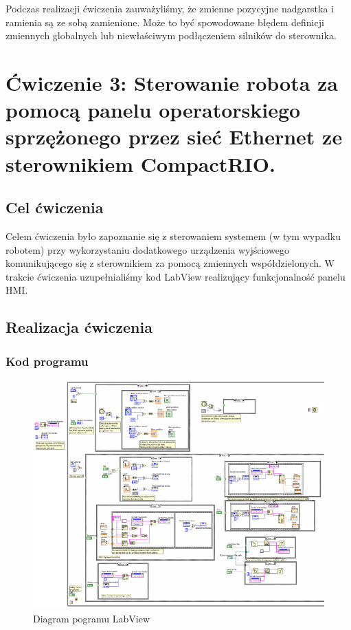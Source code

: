 \documentclass[margin = 2cm]{article}
\begin{document}
Podczas realizacji ćwiczenia zauważyliśmy, że zmienne pozycyjne nadgarstka i ramienia są ze sobą zamienione. Może to być spowodowane błędem definicji zmiennych globalnych lub niewłaściwym podłączeniem silników do sterownika.


\section{Ćwiczenie 3: Sterowanie robota za pomocą panelu operatorskiego sprzężonego przez sieć
Ethernet ze sterownikiem CompactRIO.}

\subsection{Cel ćwiczenia}

Celem ćwiczenia było zapoznanie się z sterowaniem systemem (w tym wypadku robotem) przy wykorzystaniu dodatkowego urządzenia wyjściowego komunikującego się z sterownikiem za pomocą zmiennych współdzielonych. W trakcie ćwiczenia uzupełnialiśmy kod LabView realizujący funkcjonalność panelu HMI.

\subsection{Realizacja ćwiczenia}

\subsubsection{Kod programu}

\begin{figure}[H]
	\centering
	\includegraphics[width=\textwidth]{kod}
	\caption{Diagram pogramu LabView}
\end{figure}
\end{document}
